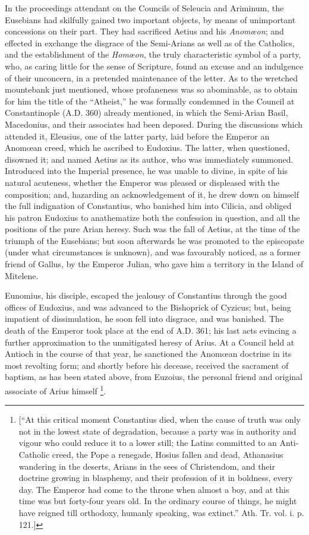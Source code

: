 In the proceedings attendant on the Councils of Seleucia and
Ariminum, the Eusebians had skilfully gained two important objects, by
means of unimportant concessions on their part. They had sacrificed
Aetius and his \emph{Anomœon}; and effected in exchange the disgrace
of the Semi-Arians as well as of the Catholics, and the establishment
of the \emph{Homœon}, the truly characteristic symbol of a party,
who, as caring little for the sense of Scripture, found an excuse and
an indulgence of their unconcern, in a pretended maintenance of the
letter. As to the wretched mountebank just mentioned, whose
profaneness was so abominable, as to obtain for him the title of the
``Atheist,'' he was formally condemned in the Council at
Constantinople (A.D. 360) already mentioned, in
which the Semi-Arian Basil, Macedonius, and their associates had been
deposed. During the discussions which attended it, Eleusius, one of
the latter party, laid before the Emperor an Anomœan creed, which he
ascribed to Eudoxius. The latter, when questioned, disowned it; and
named Aetius as its author, who was immediately summoned. Introduced
into the Imperial presence, he was unable to divine, in spite of his
natural acuteness, whether the Emperor was pleased or displeased with
the composition; and, hazarding an acknowledgement of it, he drew down
on himself the full indignation of Constantius, who banished him into
Cilicia, and obliged his patron Eudoxius to anathematize both the
confession in question, and all the positions of the pure Arian
heresy. Such was the fall of Aetius, at the time of the triumph of the
Eusebians; but soon afterwards he was promoted to the episcopate
(under what circumstances is unknown), and was favourably
noticed, as a former friend of Gallus, by the Emperor Julian, who gave
him a territory in the Island of Mitelene.

Eunomius, his disciple, escaped the jealousy of Constantius through
the good offices of Eudoxius, and was advanced to the Bishoprick of
Cyzicus; but, being impatient of dissimulation, he soon fell into
disgrace, and was banished. The death of the Emperor took place at the
end of A.D. 361; his last acts evincing a
further approximation to the unmitigated heresy of Arius. At a Council
held at Antioch in the course of that year, he sanctioned the Anomœan
doctrine in its most revolting form; and shortly before his decease,
received the sacrament of baptism, as has been stated above, from
Euzoius, the personal friend and original associate of Arius himself \footnote{[``At this critical moment Constantius
died, when the cause of truth was only not in the lowest state of
degradation, because a party was in authority and vigour who could
reduce it to a lower still; the Latins committed to an Anti-Catholic
creed, the Pope a renegade, Hosius fallen and dead, Athanasius
wandering in the deserts, Arians in the sees of Christendom, and their
doctrine growing in blasphemy, and their profession of it in boldness,
every day. The Emperor had come to the throne when almost a boy, and
at this time was but forty-four years old. In the ordinary course of
things, he might have reigned till orthodoxy, humanly speaking, was
extinct.'' Ath. Tr. vol. i. p. 121.]}.

